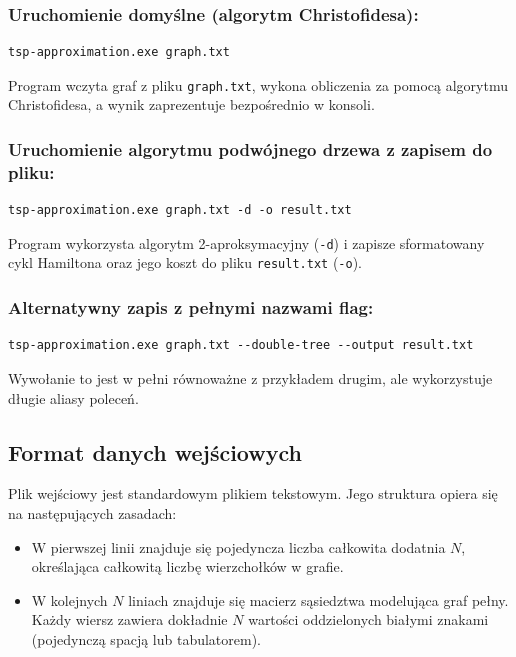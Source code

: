 \documentclass{article}
\theoremstyle{definition}
\theoremstyle{plain}
\theoremstyle{remark}
\begin{document}
\subsubsection*{Uruchomienie domyślne (algorytm Christofidesa):}

\begin{verbatim}
tsp-approximation.exe graph.txt
\end{verbatim}

\noindent
Program wczyta graf z pliku \texttt{graph.txt}, wykona obliczenia za pomocą algorytmu Christofidesa, a wynik zaprezentuje bezpośrednio w konsoli.

\subsubsection*{Uruchomienie algorytmu podwójnego drzewa z zapisem do pliku:}
\begin{verbatim}
tsp-approximation.exe graph.txt -d -o result.txt
\end{verbatim}
Program wykorzysta algorytm 2-aproksymacyjny (\texttt{-d}) i zapisze sformatowany cykl Hamiltona oraz jego koszt do pliku \texttt{result.txt} (\texttt{-o}).

\subsubsection*{Alternatywny zapis z pełnymi nazwami flag:}
\begin{verbatim}
tsp-approximation.exe graph.txt --double-tree --output result.txt
\end{verbatim}
Wywołanie to jest w pełni równoważne z przykładem drugim, ale wykorzystuje długie aliasy poleceń.

\subsection{Format danych wejściowych}

Plik wejściowy jest standardowym plikiem tekstowym. Jego struktura opiera się na następujących zasadach:
\begin{itemize}
    \item W pierwszej linii znajduje się pojedyncza liczba całkowita dodatnia $N$, określająca całkowitą liczbę wierzchołków w grafie.
    \item W kolejnych $N$ liniach znajduje się macierz sąsiedztwa modelująca graf pełny. Każdy wiersz zawiera dokładnie $N$ wartości oddzielonych białymi znakami (pojedynczą spacją lub tabulatorem).
\end{itemize}
\end{document}
